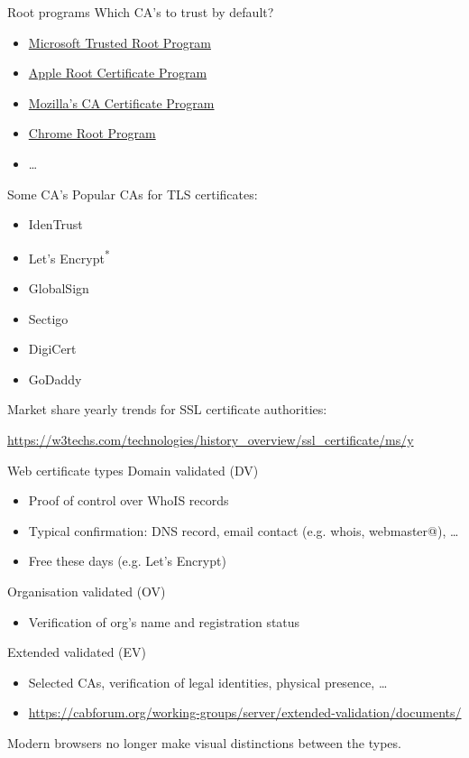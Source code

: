 \begin{frame}{Root programs}
  \pause
  Which CA's to trust by default?
  \begin{itemize}[<+(1)->]
    \item \href{https://aka.ms/RootCert}{Microsoft Trusted Root Program}
    \item \href{https://www.apple.com/certificateauthority/ca_program.html}{Apple Root Certificate Program}
    \item \href{https://wiki.mozilla.org/CA}{Mozilla's CA Certificate Program}
    \item \href{https://g.co/chrome/root-policy}{Chrome Root Program}
    \item \dots
  \end{itemize}
\end{frame}

\begin{frame}{Some CA's}
  Popular CAs for TLS certificates:
  \begin{itemize}[<+(1)->]
    \item IdenTrust
    \item Let's Encrypt\textsuperscript{*}
    \item GlobalSign
    \item Sectigo
    \item DigiCert
    \item GoDaddy
  \end{itemize}
  
  \vfill

  \pause
  Market share yearly trends for SSL certificate authorities:

  {\scriptsize\url{https://w3techs.com/technologies/history_overview/ssl_certificate/ms/y}}
\end{frame}

\begin{frame}{Web certificate types}
  Domain validated (DV)
  \begin{itemize}[<+(1)->]
    \item Proof of control over WhoIS records
    \item Typical confirmation: DNS record, email contact (e.g. whois, webmaster@), \dots
    \item Free these days (e.g. Let's Encrypt)
  \end{itemize}

  \pause
  Organisation validated (OV)
  \begin{itemize}[<+(1)->]
    \item Verification of org's name and registration status
  \end{itemize}

  \pause
  Extended validated (EV)
  \begin{itemize}[<+(1)->]
    \item Selected CAs, verification of legal identities, physical presence, \dots
    \item {\scriptsize\url{https://cabforum.org/working-groups/server/extended-validation/documents/}}
  \end{itemize}

  \pause
  Modern browsers no longer make visual distinctions between the types.
\end{frame}


